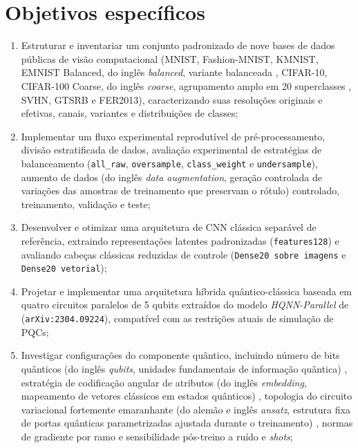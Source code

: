 \documentclass[
    12pt,
    openright,
    oneside,
    a4paper,
    english,
    brazil
]{abntex2}
\begin{document}
\section{Objetivos específicos}

\begin{enumerate} 
    \item Estruturar e inventariar um conjunto padronizado de nove bases de dados públicas de visão computacional (MNIST, Fashion-MNIST, KMNIST, EMNIST Balanced, do inglês \textit{balanced}, variante balanceada \cite{cohen2017emnist}, CIFAR-10, CIFAR-100 Coarse, do inglês \textit{coarse}, agrupamento amplo em 20 superclasses \cite{krizhevsky2009learning}, SVHN, GTSRB e FER2013), caracterizando suas resoluções originais e efetivas, canais, variantes e distribuições de classes;
    \item Implementar um fluxo experimental reprodutível de pré-processamento, divisão estratificada de dados, avaliação experimental de estratégias de balanceamento (\texttt{all\_raw}, \texttt{oversample}, \texttt{class\_weight} e \texttt{undersample}), aumento de dados (do inglês \textit{data augmentation}, geração controlada de variações das amostras de treinamento que preservam o rótulo) \cite{goodfellow2016deep,cubuk2019autoaugment} controlado, treinamento, validação e teste;
    \item Desenvolver e otimizar uma arquitetura de CNN clássica separável de referência, extraindo representações latentes padronizadas (\texttt{features128}) e avaliando cabeças clássicas reduzidas de controle (\texttt{Dense20 sobre imagens} e \texttt{Dense20 vetorial});
    \item Projetar e implementar uma arquitetura híbrida quântico-clássica baseada em quatro circuitos paralelos de 5 qubits extraídos do modelo \textit{HQNN-Parallel} de  (\texttt{arXiv:2304.09224}), compatível com as restrições atuais de simulação de PQCs;
    \item Investigar configurações do componente quântico, incluindo número de bits quânticos (do inglês \textit{qubits}, unidades fundamentais de informação quântica) \cite{nielsen2010quantum}, estratégia de codificação angular de atributos (do inglês \textit{embedding}, mapeamento de vetores clássicos em estados quânticos) \cite{schuld2021effect,perezsalinas2020data}, topologia do circuito variacional fortemente emaranhante (do alemão e inglês \textit{ansatz}, estrutura fixa de portas quânticas parametrizadas ajustada durante o treinamento) \cite{cerezo2021variational,senokosov2024qml}, normas de gradiente por ramo e sensibilidade pós-treino a ruído e \textit{shots};

\end{enumerate}
\end{document}
